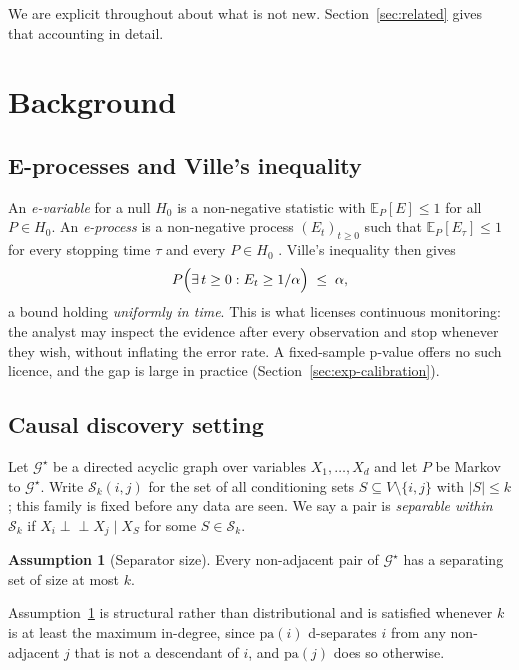 \documentclass[11pt,a4paper]{article}
\theoremstyle{definition}
\newtheorem{assumption}[theorem]{Assumption}
\theoremstyle{remark}
\newcommand{\indep}{\perp\!\!\!\perp}
\newcommand{\Scal}{\mathcal{S}}
\newcommand{\Gstar}{\mathcal{G}^{\star}}
\newcommand{\pa}{\mathrm{pa}}
\begin{document}
We are explicit throughout about what is not new. Section~\ref{sec:related}
gives that accounting in detail.

\section{Background}
\label{sec:background}

\subsection{E-processes and Ville's inequality}

An \emph{e-variable} for a null $H_0$ is a non-negative statistic with
$\mathbb{E}_P[E] \le 1$ for all $P \in H_0$. An \emph{e-process} is a
non-negative process $(E_t)_{t \ge 0}$ such that $\mathbb{E}_P[E_\tau] \le 1$
for every stopping time $\tau$ and every $P \in H_0$
\citep{ramdas2023gametheoretic,grunwald2024safe}. Ville's inequality then gives
\begin{equation}
\label{eq:ville}
P\Bigl( \exists\, t \ge 0 : E_t \ge 1/\alpha \Bigr) \;\le\; \alpha ,
\end{equation}
a bound holding \emph{uniformly in time}. This is what licenses continuous
monitoring: the analyst may inspect the evidence after every observation and
stop whenever they wish, without inflating the error rate. A fixed-sample
p-value offers no such licence, and the gap is large in practice
(Section~\ref{sec:exp-calibration}).

\subsection{Causal discovery setting}

Let $\Gstar$ be a directed acyclic graph over variables $X_1,\dots,X_d$ and let
$P$ be Markov to $\Gstar$. Write $\Scal_k(i,j)$ for the set of all conditioning
sets $S \subseteq V \setminus \{i,j\}$ with $|S| \le k$; this family is fixed
before any data are seen. We say a pair is \emph{separable within $\Scal_k$} if
$X_i \indep X_j \mid X_S$ for some $S \in \Scal_k$.

\begin{assumption}[Separator size]
\label{ass:sep}
Every non-adjacent pair of $\Gstar$ has a separating set of size at most $k$.
\end{assumption}

\noindent Assumption~\ref{ass:sep} is structural rather than distributional and
is satisfied whenever $k$ is at least the maximum in-degree, since $\pa(i)$
d-separates $i$ from any non-adjacent $j$ that is not a descendant of $i$, and
$\pa(j)$ does so otherwise.
\end{document}
